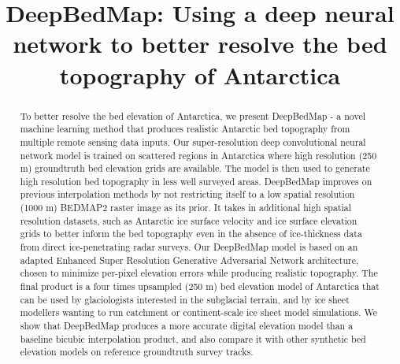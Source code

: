 \documentclass[tc, manuscript]{copernicus}
\begin{document}
\title{DeepBedMap: Using a deep neural network to better resolve the bed topography of Antarctica}














\received{}
\pubdiscuss{} %
\revised{}
\accepted{}
\published{}




\maketitle



\begin{abstract}
To better resolve the bed elevation of Antarctica, we present DeepBedMap - a novel machine learning method that produces realistic Antarctic bed topography from multiple remote sensing data inputs.
Our super-resolution deep convolutional neural network model is trained on scattered regions in Antarctica where high resolution (250 m) groundtruth bed elevation grids are available.
The model is then used to generate high resolution bed topography in less well surveyed areas.
DeepBedMap improves on previous interpolation methods by not restricting itself to a low spatial resolution (1000 m) BEDMAP2 raster image as its prior.
It takes in additional high spatial resolution datasets, such as Antarctic ice surface velocity and ice surface elevation grids to better inform the bed topography even in the absence of ice-thickness data from direct ice-penetrating radar surveys.
Our DeepBedMap model is based on an adapted Enhanced Super Resolution Generative Adversarial Network architecture, chosen to minimize per-pixel elevation errors while producing realistic topography.
The final product is a four times upsampled (250 m) bed elevation model of Antarctica that can be used by glaciologists interested in the subglacial terrain, and by ice sheet modellers wanting to run catchment or continent-scale ice sheet model simulations.
We show that DeepBedMap produces a more accurate digital elevation model than a baseline bicubic interpolation product, and also compare it with other synthetic bed elevation models on reference groundtruth survey tracks.
\end{abstract}
\end{document}
